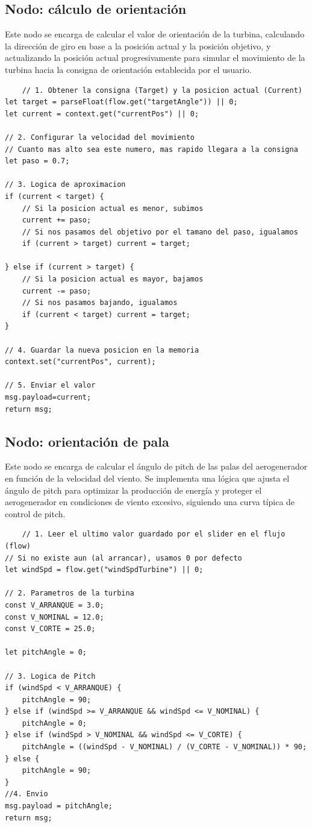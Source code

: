 \subsection{Nodo: cálculo de orientación}
Este nodo se encarga de calcular el valor de orientación de la turbina, calculando la dirección de giro en base a la posición actual y la posición objetivo, y actualizando la posición actual progresivamente para simular el movimiento de la turbina hacia la consigna de orientación establecida por el usuario.
\begin{lstlisting}
    // 1. Obtener la consigna (Target) y la posicion actual (Current)
let target = parseFloat(flow.get("targetAngle")) || 0;
let current = context.get("currentPos") || 0;

// 2. Configurar la velocidad del movimiento
// Cuanto mas alto sea este numero, mas rapido llegara a la consigna
let paso = 0.7; 

// 3. Logica de aproximacion
if (current < target) {
    // Si la posicion actual es menor, subimos
    current += paso;
    // Si nos pasamos del objetivo por el tamano del paso, igualamos
    if (current > target) current = target;
    
} else if (current > target) {
    // Si la posicion actual es mayor, bajamos
    current -= paso;
    // Si nos pasamos bajando, igualamos
    if (current < target) current = target;
}

// 4. Guardar la nueva posicion en la memoria 
context.set("currentPos", current);

// 5. Enviar el valor 
msg.payload=current;
return msg;
\end{lstlisting}
\subsection{Nodo: orientación de pala}
Este nodo se encarga de calcular el ángulo de pitch de las palas del aerogenerador en función de la velocidad del viento. Se implementa una lógica que ajusta el ángulo de pitch para optimizar la producción de energía y proteger el aerogenerador en condiciones de viento excesivo, siguiendo una curva típica de control de pitch.
\begin{lstlisting}
    // 1. Leer el ultimo valor guardado por el slider en el flujo (flow)
// Si no existe aun (al arrancar), usamos 0 por defecto
let windSpd = flow.get("windSpdTurbine") || 0;

// 2. Parametros de la turbina
const V_ARRANQUE = 3.0;
const V_NOMINAL = 12.0;
const V_CORTE = 25.0;

let pitchAngle = 0;

// 3. Logica de Pitch
if (windSpd < V_ARRANQUE) {
    pitchAngle = 90; 
} else if (windSpd >= V_ARRANQUE && windSpd <= V_NOMINAL) {
    pitchAngle = 0; 
} else if (windSpd > V_NOMINAL && windSpd <= V_CORTE) {
    pitchAngle = ((windSpd - V_NOMINAL) / (V_CORTE - V_NOMINAL)) * 90;
} else {
    pitchAngle = 90; 
}
//4. Envio
msg.payload = pitchAngle;
return msg;
\end{lstlisting}
